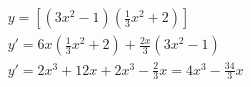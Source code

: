 \begin{ex}
\begin{align}
&y=\left[(3x^2-1)\left(\frac{1}{3}x^2+2\right)\right]\nonumber\\
&y'=6x\left(\frac{1}{3}x^2+2\right)+\frac{2x}{3}(3x^2-1)\nonumber\\
&y'=2x^3+12x+2x^3-\frac{2}{3}x=4x^3-\frac{34}{3}x\nonumber
\end{align}
\end{ex}